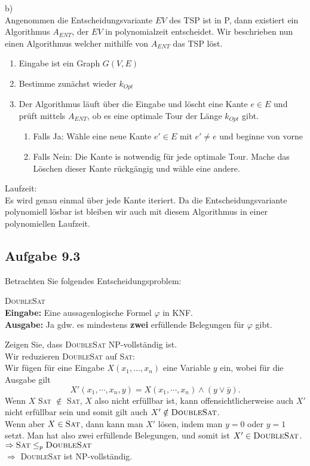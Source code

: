 b)\\
Angenommen die Entscheidungsvariante $EV$ des TSP ist in P, dann existiert ein Algorithmus $A_{ENT}$,
der $EV$ in polynomialzeit entscheidet. Wir beschrieben nun einen Algorithmus welcher mithilfe von $A_{ENT}$
das TSP löst.
\begin{enumerate}
	\item Eingabe ist ein Graph $G(V,E)$
	\item Bestimme zunächst wieder $k_{Opt}$
	\item Der Algorithmus läuft über die Eingabe und löscht eine Kante $e \in E$ und prüft mittels
		$A_{ENT}$, ob es eine optimale Tour der Länge $k_{Opt}$ gibt.
		\begin{enumerate}
			\item Falls Ja: Wähle eine neue Kante $e' \in E$ mit $e' \not= e$ und beginne von vorne
			\item Falls Nein: Die Kante is notwendig für jede optimale Tour. Mache das Löschen dieser
				Kante rückgängig und wähle eine andere.
		\end{enumerate}
\end{enumerate}

Laufzeit:\\
Es wird genau einmal über jede Kante iteriert. Da die Entscheidungsvariante polynomiell lösbar ist bleiben 
wir auch mit diesem Algorithmus in einer polynomiellen Laufzeit.

\subsection*{Aufgabe 9.3}
Betrachten Sie folgendes Entscheidungsproblem:
\begin{framed}
	\textsc{DoubleSat}\\
	\textbf{Eingabe:} Eine aussagenlogische Formel $\varphi$ in KNF.\\
	\textbf{Ausgabe:} Ja gdw. es mindestens \textbf{zwei} erfüllende Belegungen für $\varphi$ gibt.
\end{framed}
Zeigen Sie, dass \textsc{DoubleSat} NP-vollständig ist.\\

Wir reduzieren \textsc{DoubleSat} auf \textsc{Sat}:\\
Wir fügen für eine Eingabe $X(x_1, \dots, x_n)$ eine Variable $y$ ein, wobei für die Ausgabe gilt $$X'(x_1, \cdots, x_n, y) = X(x_1, \cdots, x_n) \land (y \lor \bar{y}).$$
Wenn $X$ \textsc{Sat} $\notin$ \textsc{Sat}, $X$ also nicht erfüllbar ist, kann offensichtlicherweise auch $X'$ nicht erfüllbar sein und somit gilt auch $X' \notin \textsc{DoubleSat}$.\\
Wenn aber $X \in \textsc{Sat}$, dann kann man $X'$ lösen, indem man $y=0$ oder $y=1$ setzt. Man hat also zwei erfüllende Belegungen, und somit ist $X' \in \textsc{DoubleSat}$.\\
$\Rightarrow \textsc{Sat} \leq_p \textsc{DoubleSat}$\\
$\Rightarrow$ \textsc{DoubleSat} ist NP-vollständig.